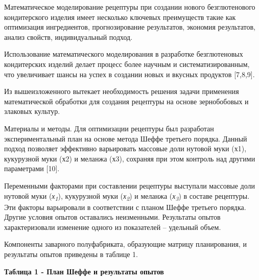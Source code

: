 Математическое моделирование рецептуры при создании нового
безглютенового кондитерского изделия имеет несколько ключевых
преимуществ такие как оптимизация ингредиентов, прогнозирование
результатов, экономия результатов, анализ свойств, индивидуальный
подход.

Использование математического моделирования в разработке безглютеновых
кондитерских изделий делает процесс более научным и систематизированным,
что увеличивает шансы на успех в создании новых и вкусных продуктов
{[}7,8,9{]}.

Из вышеизложенного вытекает необходимость решения задачи применения
математической обработки для создания рецептуры на основе зернобобовых и
злаковых культур.

Материалы и методы. Для оптимизации рецептуры был разработан
экспериментальный план на основе метода Шеффе третьего порядка. Данный
подход позволяет эффективно варьировать массовые доли нутовой муки (х1),
кукурузной муки (х2) и меланжа (х3), сохраняя при этом контроль над
другими параметрами {[}10{]}.

Переменными факторами при составлении рецептуры выступали массовые доли
нутовой муки (\emph{х\textsubscript{1}}), кукурузной муки
(\emph{х\textsubscript{2}}) и меланжа (\emph{х\textsubscript{3}}) в
составе рецептуры. Эти факторы варьировали в соответствии с планом Шеффе
третьего порядка. Другие условия опытов оставались неизменными.
Результаты опытов характеризовали изменение одного из показателей --
удельный объем.

Компоненты заварного полуфабриката, образующие матрицу планирования, и
результаты опытов приведены в таблице 1.

{\bfseries Таблица 1 - План Шеффе и результаты опытов}

